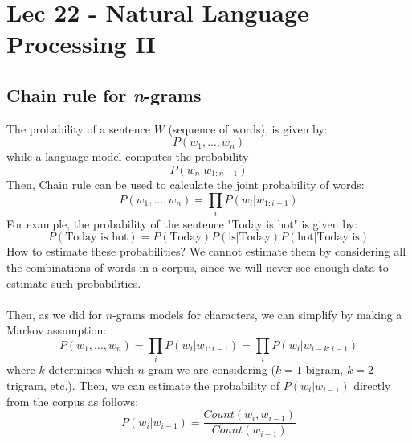 \chapter{Lec 22 - Natural Language Processing II}

\section{Chain rule for \textit{n}-grams}
The probability of a sentence $W$ (sequence of words), is given by:
\[P(w_1, ..., w_n)\]
while a language model computes the probability
\[P(w_n| w_{1:n-1})\]
Then, Chain rule can be used to calculate the joint probability of
words:
\[P(w_1, ..., w_n) = \prod_i P(w_i | w_{1:i-1})\]
For example, the probability of the sentence "Today is hot" is given by:
\[P(\text{Today is hot}) = P(\text{Today})P(\text{is}|\text{Today})P(\text{hot}|\text{Today is})\]
How to estimate these probabilities? We cannot estimate them by considering all the combinations of words in a corpus, since we will never see enough data to estimate such probabilities.\\\\
Then, as we did for $n$-grams models for characters, we can simplify by making a Markov assumption:
\[P(w_1, ..., w_n) = \prod_i P(w_i | w_{1:i-1}) = \prod_i P(w_i | w_{i-k:i-1})\]
where $k$ determines which $n$-gram we are considering ($k=1$ bigram, $k=2$ trigram, etc.). Then, we can estimate the probability of $P(w_i|w_{i-1})$ directly from the corpus as follows:
\[P(w_i|w_{i-1}) = \frac{Count(w_i, w_{i-1})}{Count(w_{i-1})}\]



